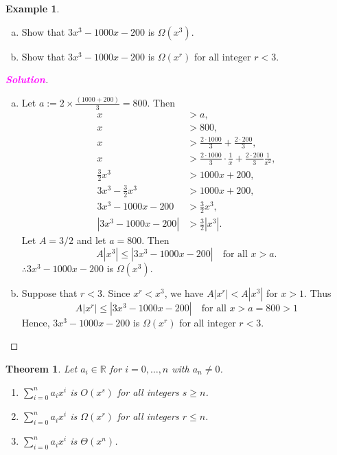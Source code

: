 \documentclass[12pt,openany]{book}
\newtheorem{theorem}{Theorem}[chapter]
\theoremstyle{definition}
\newtheorem{example}{Example}[chapter]
\newcommand{\R}{\mathbb{R}}
\newcommand{\sol}{\textcolor{magenta}{\bf Solution}}
\begin{document}
	\newpage
	\begin{example}
		\ \begin{enumerate}[a.]
			\item Show that \(3x^3-1000x-200\) is $\Omega(x^3)$.
			\item Show that \(3x^3-1000x-200\) is $\Omega(x^r)$ for all integer $r<3$.
		\end{enumerate}
		\begin{proof}[\sol]
			\ \begin{enumerate}[a.]
				\item Let $\displaystyle a:=2\times \frac{(1000+200)}{3}=800$. Then \begin{align*}
					x&>a,\\
					x&>800,\\
					x&>\frac{2\cdot 1000}{3}+\frac{2\cdot 200}{3},\\
					x&>\frac{2\cdot 1000}{3}\cdot\frac{1}{x}+\frac{2\cdot 200}{3}\frac{1}{x^2},\\
					\frac{3}{2}x^3&>1000x+200,\\
					3x^3-\frac{3}{2}x^3&>1000x+200,\\
					3x^3-1000x-200&>\frac{3}{2}x^3,\\
					|3x^3-1000x-200|&>\frac{3}{2}|x^3|.
				\end{align*}
				Let $A=3/2$ and let $a=800$. Then \[
				A|x^3|\leq|3x^3-1000x-200|\quad\text{for all $x>a$}.
				\] $\therefore 3x^3-1000x-200$ is $\Omega(x^3)$.
				\item Suppose that $r<3$. Since $x^r<x^3$, we have $A|x^r|<A|x^3|$ for $x>1$. Thus \[
				A|x^r|\leq|3x^3-1000x-200|\quad\text{for all $x>a=800>1$}
				\] Hence, $3x^3-1000x-200$ is $\Omega(x^r)$ for all integer $r<3$.
			\end{enumerate}
		\end{proof}
	\end{example}
	\vspace{20pt}
	\newpage
	\begin{tcolorbox}[colframe=thmcolor,title={\color{white}\bf On Polynomial Orders}]
		\begin{theorem}
			Let $a_i\in\R$ for $i=0,\dots,n$ with $a_n\neq 0$.
			\begin{enumerate}[(1)]
				\item $\sum_{i=0}^{n}a_ix^i$ is $O(x^s)$ for all integers $s\geq n$.
				\item $\sum_{i=0}^{n}a_ix^i$ is $\Omega(x^r)$ for all integers $r\leq n$.
				\item $\sum_{i=0}^{n}a_ix^i$ is $\Theta(x^n)$.
			\end{enumerate}
		\end{theorem}
	\end{tcolorbox}
\end{document}

